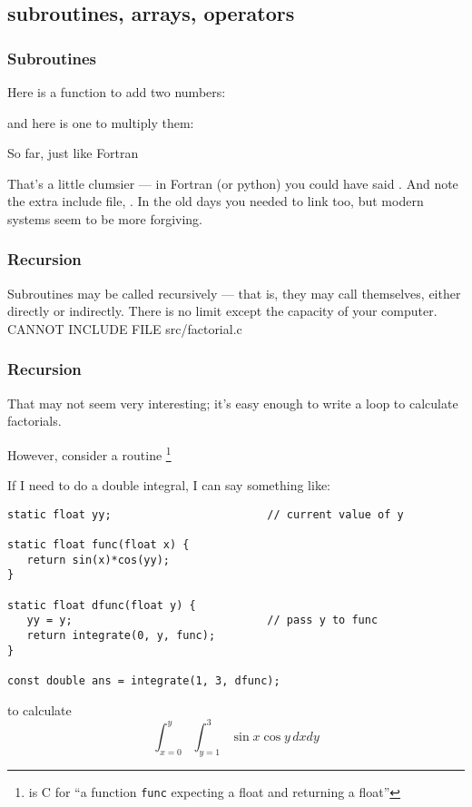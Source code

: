 \documentclass[10pt, t]{beamer}
\begin{document}
\subsection{subroutines, arrays, operators}
\label{sec-3_1}
\begin{frame}
\frametitle{Subroutines}
\label{sec-3_1_1}

Here is a function to add two numbers:


\pause
and here is one to multiply them:


\pause
So far, just like Fortran

\pause
{}

\pause
That's a little clumsier --- in Fortran (or python) you could have said .  And 
note the extra include file, .  In the old days you needed to link  too, but modern 
systems seem to be more forgiving.
\end{frame}
\begin{frame}
\frametitle{Recursion}
\label{sec-3_1_2}

Subroutines may be called recursively --- that is, they may call themselves, either directly or indirectly.
There is no limit except the capacity of your computer.
CANNOT INCLUDE FILE src/factorial.c
\end{frame}
\begin{frame}[fragile]
\frametitle{Recursion}
\label{sec-3_1_3}

That may not seem very interesting; it's easy enough to write a loop to calculate factorials.  

However, consider a routine  \footnote{ is C for ``a function \texttt{func} expecting a float and returning a float'' }

\pause

If I need to do a double integral, I can say something like:
\begin{verbatim}
static float yy;                        // current value of y

static float func(float x) {
   return sin(x)*cos(yy);
}

static float dfunc(float y) {
   yy = y;                              // pass y to func
   return integrate(0, y, func);
}

const double ans = integrate(1, 3, dfunc);
\end{verbatim}

to calculate
$$
\int_{x=0}^{y} \int_{y=1}^{3} \sin x \cos y \,  d\!x d\!y
$$
\end{frame}
\end{document}
